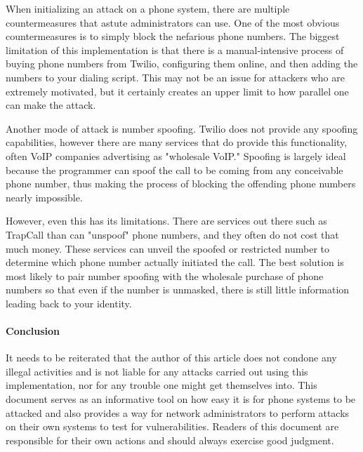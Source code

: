 \documentclass[10pt]{report}
\begin{document}
When initializing an attack on a phone system, there are multiple countermeasures that astute administrators can use. One of the most obvious countermeasures is to simply block the nefarious phone numbers. The biggest limitation of this implementation is that there is a manual-intensive process of buying phone numbers from Twilio, configuring them online, and then adding the numbers to your dialing script. This may not be an issue for attackers who are extremely motivated, but it certainly creates an upper limit to how parallel one can make the attack. 

Another mode of attack is number spoofing. Twilio does not provide any spoofing capabilities, however there are many services that do provide this functionality, often VoIP companies advertising as "wholesale VoIP." Spoofing is largely ideal because the programmer can spoof the call to be coming from any conceivable phone number, thus making the process of blocking the offending phone numbers nearly impossible. 

However, even this has its limitations. There are services out there such as TrapCall than can "unspoof" phone numbers, and they often do not cost that much money. These services can unveil the spoofed or restricted number to determine which phone number actually initiated the call. The best solution is most likely to pair number spoofing with the wholesale purchase of phone numbers so that even if the number is unmasked, there is still little information leading back to your identity.

\paragraph{Conclusion}
It needs to be reiterated that the author of this article does not condone any illegal activities and is not liable for any attacks carried out using this implementation, nor for any trouble one might get themselves into. This document serves as an informative tool on how easy it is for phone systems to be attacked and also provides a way for network administrators to perform attacks on their own systems to test for vulnerabilities. Readers of this document are responsible for their own actions and should always exercise good judgment.
\end{document}
